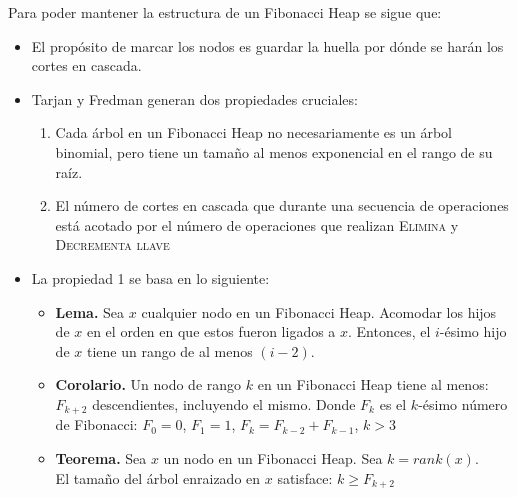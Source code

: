 \documentclass[a4paper, titlepage, 12pt]{article}
\theoremstyle{definition}%
\theoremstyle{Teorema}
\theoremstyle{break}
\begin{document}
Para poder mantener la estructura de un Fibonacci Heap se sigue que:
\begin{itemize}
  \item El propósito de marcar los nodos es guardar la huella por dónde se harán los cortes en cascada.
  \item Tarjan y Fredman generan dos propiedades cruciales:
  \begin{enumerate}
    \item Cada árbol en un Fibonacci Heap no necesariamente es un árbol binomial, pero tiene un tamaño al menos exponencial en el rango de su raíz.
    \item El número de cortes en cascada que durante una secuencia de operaciones está acotado por el número de operaciones que realizan \textsc{Elimina} y 
    \textsc{Decrementa llave}
  \end{enumerate}
  \item La propiedad 1 se basa en lo siguiente:
  \begin{itemize}
    \item \textbf{Lema.} Sea $x$ cualquier nodo en un Fibonacci Heap. Acomodar los hijos de $x$ en el orden en que estos fueron ligados a $x$. Entonces, 
    el $i$-ésimo hijo de $x$ tiene un rango de al menos $(i-2)$.
    \item \textbf{Corolario.} Un nodo de rango $k$ en un Fibonacci Heap tiene al menos: $F_{k+2}$ descendientes, incluyendo el mismo. Donde $F_k$ es el $k$-ésimo 
    número de Fibonacci: $F_0=0$, $F_1=1$, $F_k=F_{k-2}+F_{k-1}$, $k>3$
    \item \textbf{Teorema.} Sea $x$ un nodo en un Fibonacci Heap. Sea $k=rank(x)$.\\
    El tamaño del árbol enraizado en $x$ satisface: $k\geq F_{k+2}$
  \end{itemize}
\end{itemize}
\end{document}

